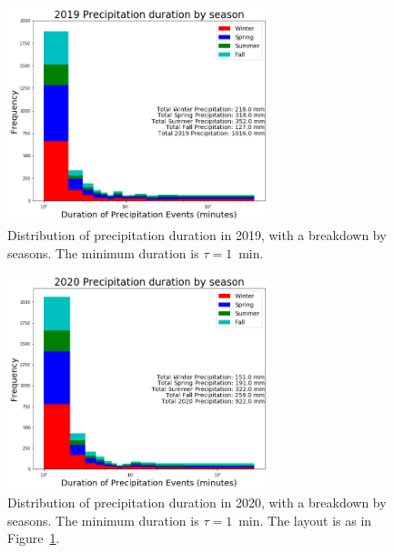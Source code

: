 \documentclass[11pt]{report}
\begin{document}
\clearpage
\begin{figure}[t]
  \centering
  \includegraphics[width=0.675\textwidth]{Figures/precip_2019.png}
  \caption[Precipitation histogram for 2019 broken down by season]
          {\label{p2019}Distribution of precipitation duration in 2019, with
            a breakdown by seasons. The minimum duration is $\tau = 1$~min.
          }
\end{figure}

\begin{figure}[b]
  \centering
  \includegraphics[width=0.675\textwidth]{Figures/precip_2020.png}
  \caption[Precipitation histogram for 2020 broken down by
    season]{\label{p2020}Distribution of precipitation duration in 2020,
    with a breakdown by seasons. The minimum duration is $\tau=1$~min. The
    layout is as in Figure~\ref{p2019}.}
\end{figure}
\end{document}
